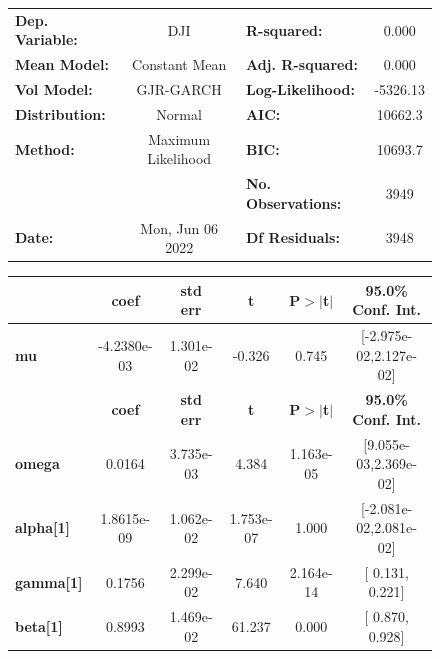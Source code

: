 \documentclass[a4paper, oneside]{discothesis}
\begin{document}
\begin{figure}
\begin{multicols}{2}
{  
\begin{center}
\begin{tabular}{lclc}
\toprule
\textbf{Dep. Variable:} &         DJI        & \textbf{  R-squared:         } &     0.000   \\
\textbf{Mean Model:}    &   Constant Mean    & \textbf{  Adj. R-squared:    } &     0.000   \\
\textbf{Vol Model:}     &     GJR-GARCH      & \textbf{  Log-Likelihood:    } &   -5326.13  \\
\textbf{Distribution:}  &       Normal       & \textbf{  AIC:               } &    10662.3  \\
\textbf{Method:}        & Maximum Likelihood & \textbf{  BIC:               } &    10693.7  \\
\textbf{}               &                    & \textbf{  No. Observations:  } &    3949     \\
\textbf{Date:}          &  Mon, Jun 06 2022  & \textbf{  Df Residuals:      } &    3948     \\
\bottomrule
\end{tabular}
\begin{tabular}{lccccc}
            & \textbf{coef} & \textbf{std err} & \textbf{t} & \textbf{P$> |$t$|$} & \textbf{95.0\% Conf. Int.}  \\
\midrule
\textbf{mu} &  -4.2380e-03  &    1.301e-02     &    -0.326  &          0.745       &   [-2.975e-02,2.127e-02]    \\
                  & \textbf{coef} & \textbf{std err} & \textbf{t} & \textbf{P$> |$t$|$} & \textbf{95.0\% Conf. Int.}  \\
\midrule
\textbf{omega}    &       0.0164  &    3.735e-03     &     4.384  &      1.163e-05       &   [9.055e-03,2.369e-02]     \\
\textbf{alpha[1]} &   1.8615e-09  &    1.062e-02     & 1.753e-07  &          1.000       &   [-2.081e-02,2.081e-02]    \\
\textbf{gamma[1]} &       0.1756  &    2.299e-02     &     7.640  &      2.164e-14       &     [  0.131,  0.221]       \\
\textbf{beta[1]}  &       0.8993  &    1.469e-02     &    61.237  &        0.000         &     [  0.870,  0.928]       \\
\bottomrule
\end{tabular}
\end{center}

}
\end{multicols}
\end{figure}
\end{document}
